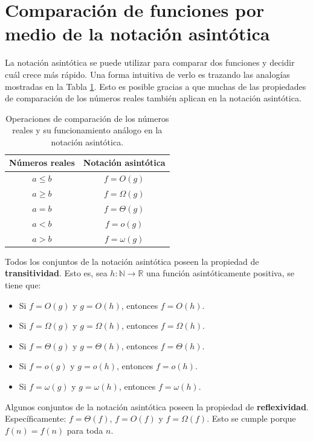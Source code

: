 \section{Comparación de funciones por medio de la notación asintótica}

La notación asintótica se puede utilizar para comparar dos funciones y decidir cuál crece más rápido. 
Una forma intuitiva de verlo es trazando las analogías mostradas en la Tabla \ref{tab:func-comp}. 
Esto es posible gracias a que muchas de las propiedades de comparación de los números reales también aplican en la notación asintótica.

\begin{table}
  \label{tab:func-comp}
  \caption{Operaciones de comparación de los números reales y su funcionamiento análogo en la notación asintótica.}
  \centering
  \begin{tabular}{cc}
    \toprule 
      Números reales & Notación asintótica\tabularnewline
    \midrule
      \(a\leq b\) & \(f=O(g)\)\tabularnewline
      \(a\ge b\) & \(f=\Omega(g)\)\tabularnewline
      \(a=b\) & \(f=\Theta(g)\)\tabularnewline
      \(a<b\) & \(f=o(g)\)\tabularnewline
      \(a>b\) & \(f=\omega(g)\)\tabularnewline
    \bottomrule
  \end{tabular}
\end{table}

Todos los conjuntos de la notación asintótica poseen la propiedad de \textbf{transitividad}.
Esto es, sea \(h:\mathbb{N}\to\mathbb{R}\) una función asintóticamente positiva, se tiene que:
\begin{itemize}
  \item Si \(f=O(g)\) y \(g=O(h)\), entonces \(f=O(h)\).
  \item Si \(f=\Omega(g)\) y \(g=\Omega(h)\), entonces \(f=\Omega(h)\).
  \item Si \(f=\Theta(g)\) y \(g=\Theta(h)\), entonces \(f=\Theta(h)\).
  \item Si \(f=o(g)\) y \(g=o(h)\), entonces \(f=o(h)\).
  \item Si \(f=\omega(g)\) y \(g=\omega(h)\), entonces \(f=\omega(h)\).
\end{itemize}

Algunos conjuntos de la notación asintótica poseen la propiedad de \textbf{reflexividad}. 
Específicamente: \(f=\Theta(f)\), \(f=O(f)\) y \(f=\Omega(f)\). 
Esto se cumple porque \(f(n)=f(n)\) para toda \(n\).



